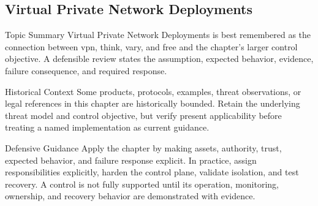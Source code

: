 \documentclass[11pt,letterpaper]{article}
\begin{document}
\subsection*{Virtual Private Network Deployments}
\begin{CornellNotesTable}
\end{CornellNotesTable}
\begin{CornellSummaryBox}{Topic Summary}
Virtual Private Network Deployments is best remembered as the connection between vpn, think, vary, and free and the chapter's larger control objective. A defensible review states the assumption, expected behavior, evidence, failure consequence, and required response.
\end{CornellSummaryBox}
\begin{CornellWarningBox}{Historical Context}
Some products, protocols, examples, threat observations, or legal references in this chapter are historically bounded. Retain the underlying threat model and control objective, but verify present applicability before treating a named implementation as current guidance.
\end{CornellWarningBox}
\begin{CornellOverviewBox}{Defensive Guidance}
Apply the chapter by making assets, authority, trust, expected behavior, and failure response explicit. In practice, assign responsibilities explicitly, harden the control plane, validate isolation, and test recovery. A control is not fully supported until its operation, monitoring, ownership, and recovery behavior are demonstrated with evidence.
\end{CornellOverviewBox}
\end{document}
